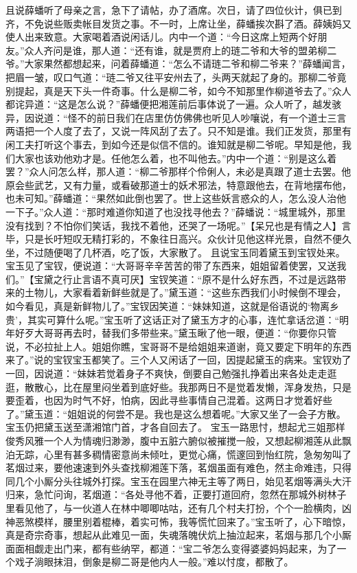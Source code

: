 \documentclass[12pt,oneside]{book}
\begin{document}
且说薛蟠听了母亲之言，急下了请帖，办了酒席。次日，请了四位伙计，俱已到齐，不免说些贩卖帐目发货之事。不一时，上席让坐，薛蟠挨次斟了酒。薛姨妈又使人出来致意。大家喝着酒说闲话儿。内中一个道：“今日这席上短两个好朋友。”众人齐问是谁，那人道：“还有谁，就是贾府上的琏二爷和大爷的盟弟柳二爷。”大家果然都想起来，问着薛蟠道：“怎么不请琏二爷和柳二爷来？”薛蟠闻言，把眉一皱，叹口气道：“琏二爷又往平安州去了，头两天就起了身的。那柳二爷竟别提起，真是天下头一件奇事。什么是柳二爷，如今不知那里作柳道爷去了。”众人都诧异道：“这是怎么说？”薛蟠便把湘莲前后事体说了一遍。众人听了，越发骇异，因说道：“怪不的前日我们在店里仿仿佛佛也听见人吵嚷说，有一个道士三言两语把一个人度了去了，又说一阵风刮了去了。只不知是谁。我们正发货，那里有闲工夫打听这个事去，到如今还是似信不信的。谁知就是柳二爷呢。早知是他，我们大家也该劝他劝才是。任他怎么着，也不叫他去。”内中一个道：“别是这么着罢？”众人问怎么样，那人道：“柳二爷那样个伶俐人，未必是真跟了道士去罢。他原会些武艺，又有力量，或看破那道士的妖术邪法，特意跟他去，在背地摆布他，也未可知。”薛蟠道：“果然如此倒也罢了。世上这些妖言惑众的人，怎么没人治他一下子。”众人道：“那时难道你知道了也没找寻他去？”薛蟠说：“城里城外，那里没有找到？不怕你们笑话，我找不着他，还哭了一场呢。”【呆兄也是有情之人】言毕，只是长吁短叹无精打彩的，不象往日高兴。众伙计见他这样光景，自然不便久坐，不过随便喝了几杯酒，吃了饭，大家散了。
且说宝玉同着黛玉到宝钗处来。宝玉见了宝钗，便说道：“大哥哥辛辛苦苦的带了东西来，姐姐留着使罢，又送我们。”【宝黛之行止言语不真可厌】宝钗笑道：“原不是什么好东西，不过是远路带来的土物儿，大家看着新鲜些就是了。”黛玉道：“这些东西我们小时候倒不理会，如今看见，真是新鲜物儿了。”宝钗因笑道：“妹妹知道，这就是俗语说的‘物离乡贵’，其实可算什么呢。”宝玉听了这话正对了黛玉方才的心事，连忙拿话岔道：“明年好歹大哥哥再去时，替我们多带些来。”黛玉瞅了他一眼，便道：“你要你只管说，不必拉扯上人。姐姐你瞧，宝哥哥不是给姐姐来道谢，竟又要定下明年的东西来了。”说的宝钗宝玉都笑了。三个人又闲话了一回，因提起黛玉的病来。宝钗劝了一回，因说道：“妹妹若觉着身子不爽快，倒要自己勉强扎挣着出来各处走走逛逛，散散心，比在屋里闷坐着到底好些。我那两日不是觉着发懒，浑身发热，只是要歪着，也因为时气不好，怕病，因此寻些事情自己混着。这两日才觉着好些了。”黛玉道：“姐姐说的何尝不是。我也是这么想着呢。”大家又坐了一会子方散。宝玉仍把黛玉送至潇湘馆门首，才各自回去了。
宝玉一路思忖，想起尤三姐那样俊秀风雅一个人为情魂归渺渺，腹中五脏六腑似被摧搅一般，又想起柳湘莲从此飘泊无踪，心里有甚多稠情密意尚未倾吐，更觉心痛，慌邃回到怡红院，急匆匆叫了茗烟过来，要他速速到外头查找柳湘莲下落，茗烟虽面有难色，然主命难违，只得同几个小厮分头往城外打探。宝玉在园里六神无主等了两日，始见茗烟等满头大汗归来，急忙问询，茗烟道：“各处寻他不着，正要打道回府，忽然在那城外树林子里看见他了，与一伙道人在林中唧唧咕咕，还有几个村夫打扮，个个一脸横肉，凶神恶煞模样，腰里别着棍棒，着实可怖，我等慌忙回来了。”宝玉听了，心下暗惊，真是奇宗奇事，想起从此难见一面，失魂落魄伏炕上抽泣起来，茗烟与那几个小厮面面相觑走出门来，都有些纳罕，都道：“宝二爷怎么变得婆婆妈妈起来，为了一个戏子淌眼抹泪，倒象是柳二哥是他内人一般。”难以忖度，都散了。
\end{document}
